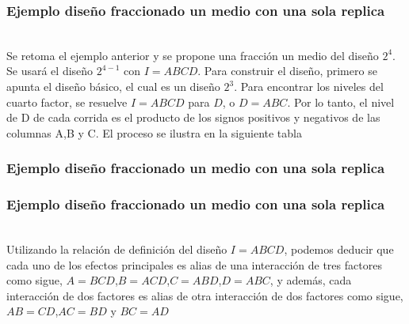 \documentclass[12pt]{beamer}
\begin{document}
\begin{frame}
\frametitle{Ejemplo diseño fraccionado un medio con una sola replica}

~\\Se retoma el ejemplo anterior y se propone una fracción un medio del diseño $2^4$. Se usará el diseño $2^{4-1}$ con $I=ABCD$. Para construir el diseño, primero se apunta el diseño básico, el cual es un diseño $2^3$. Para encontrar los niveles del cuarto factor, se resuelve $I=ABCD$ para $D$, o $D=ABC$. Por lo tanto, el nivel de D de cada corrida es el producto de los signos positivos y negativos de las columnas A,B y C. El proceso se ilustra en la siguiente tabla
\end{frame}

\begin{frame}
\frametitle{Ejemplo diseño fraccionado un medio con una sola replica}
\begin{table}[htbp]
  \centering
  \caption{Matriz de diseño $2^4$ fraccionado un medio}
  \label{tab:addlabel}%
\end{table}%
\end{frame}

\begin{frame}
\frametitle{Ejemplo diseño fraccionado un medio con una sola replica}

~\\Utilizando la relación de definición del diseño $I=ABCD$, podemos deducir que cada uno de los efectos principales es alias de una interacción de tres factores como sigue, $A=BCD$,$B=ACD$,$C=ABD$,$D=ABC$, y además, cada interacción de dos factores es alias de otra interacción de dos factores como sigue, $AB=CD$,$AC=BD$ y $BC=AD$
\end{frame}
\end{document}
